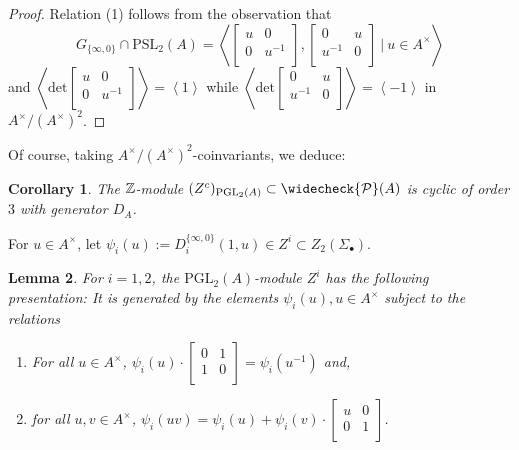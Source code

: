 \documentclass[12pt]{amsart}
\newtheorem{lem}{Lemma}[section]
\newtheorem{cor}[lem]{Corollary}
\theoremstyle{definition}
\newcommand{\Z}{\Bbb{Z}}
\newcommand{\pspl}[2]{\mathrm{PSL}_{#1}(#2)}
\newcommand{\pgl}[2]{\mathrm{PGL}_{#1}(#2)}
\newcommand{\cpb}[1]{\widecheck{\mathcal{P}}(#1)}
\newcommand{\suss}[2]{\psi_{#1}\left( #2\right)}
\newcommand{\cconst}[1]{D_{#1}}
\newcommand{\<}{\langle}
\renewcommand{\>}{\rangle}
\newcommand{\an}[1]{\left\langle{#1}\right\rangle}
\begin{document}
\begin{proof} Relation (1) follows from the observation that
 \[
G_{\{ \infty,0\}}\cap\pspl{2}{A}=
\an{ \left[
\begin{array}{cc}
u&0\\
0&u^{-1}\\
\end{array}
\right],\left[
\begin{array}{cc}
0&u\\
u^{-1}&0\\
\end{array}
\right]\ |\ u\in A^\times}
\]
and $\an{\mathrm{det}\left[
\begin{array}{cc}
u&0\\
0&u^{-1}\\
\end{array}
\right]}=\an{1}$ while $\an{\mathrm{det}\left[
\begin{array}{cc}
0&u\\
u^{-1}&0\\
\end{array}
\right]}=\an{-1}$ in $A^\times/(A^\times)^2$.
\end{proof}

Of course, taking $A^\times/(A^\times)^2$-coinvariants, we deduce:
\begin{cor}\label{cor:zcpresp} The $\Z$-module  $(Z^c)_{\pgl{2}{A}}\subset \cpb{A}$ is cyclic of order $3$ with generator $\cconst{A}$. 
\end{cor}



For $u\in A^\times$, let $\suss{i}{u}:=D_i^{\{ \infty,0\}}(1,u)\in Z^i\subset Z_2(\Sigma_\bullet)$.

\begin{lem}\label{lem:zipres} For $i=1,2$, the $\pgl{2}{A}$-module $Z^i$ has the following presentation: It is generated by the elements $\suss{i}{u},u\in A^\times$ subject to the relations
\begin{enumerate}
\item For all $u\in A^\times$, $\suss{i}{u}\cdot \left[
\begin{array}{cc}
0&1\\
1&0\\
\end{array}
\right]
=\suss{i}{u^{-1}}$ and,
\item for all $u,v\in A^\times$, $\suss{i}{uv}=\suss{i}{u}+\suss{i}{v}\cdot
\left[
\begin{array}{cc}
u&0\\
0&1\\
\end{array}
\right]$.
\end{enumerate}
\end{lem}
\end{document}
